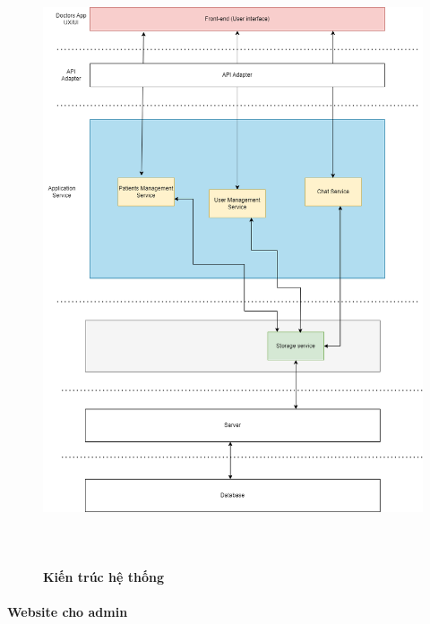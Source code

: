 \documentclass{article}%
\begin{document}
\begin{figure}[H]
  \centering
  \includegraphics[width=16cm,height=18cm]{Images/system/fmECG_architecture-Doctors.drawio.png}
  \caption[Kiến trúc hệ thống]{\bfseries \fontsize{12pt}{0pt}\selectfont Kiến trúc hệ thống}
  \label{hinh15} %
\end{figure}


\paragraph{Website cho admin}
\mbox{}
\end{document}
